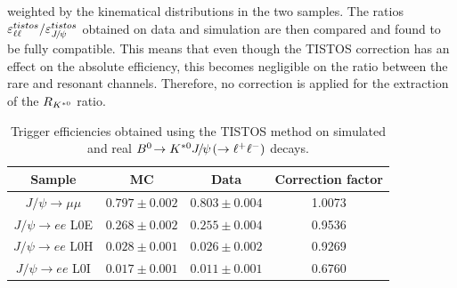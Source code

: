 weighted by the kinematical distributions in the two samples. 
%
The ratios $\varepsilon^{tistos}_{\ell\ell} / \varepsilon^{tistos}_{\jpsi}$ obtained on
data and simulation are then compared and found to be fully compatible. This means that even though
the TISTOS correction has an effect on the absolute efficiency, this becomes negligible
on the ratio between the rare and resonant channels. Therefore, no correction is applied
for the extraction of the $R_{{{K}^{*0}}}$ ratio.
%
\begin{table}[hb!]
\begin{center}
 \caption{Trigger efficiencies obtained using the TISTOS method on
 simulated and real $\decay{\Bz}{\Kstarz\jpsi(\to\ell^+\ell^-)}$ decays.}
\begin{tabular}{|c|c|c|c|}
\hline
 Sample 							&  MC  		& Data 		& Correction factor		\\ \hline
$ J/\psi \rightarrow \mu\mu$        & $ 0.797  \pm  0.002 $ & $ 0.803  \pm  0.004 $  &  1.0073  \\
$J/\psi \rightarrow ee$ L0E     & $ 0.268  \pm  0.002 $ & $ 0.255  \pm  0.004 $  &  0.9536   \\
$J/\psi \rightarrow ee$ L0H     & $ 0.028  \pm  0.001 $ & $ 0.026  \pm  0.002 $  &  0.9269   \\
$J/\psi \rightarrow ee$ L0I     & $ 0.017  \pm  0.001 $ & $ 0.011  \pm  0.001 $  &  0.6760   \\
 \hline 
  \end{tabular}
\label{tab:tistos}
\end{center}
\end{table}
%
